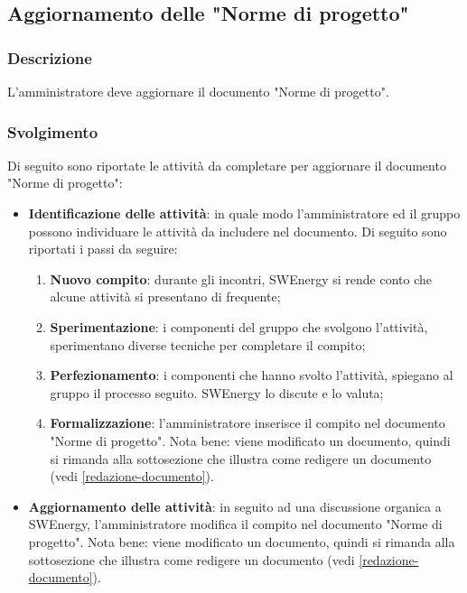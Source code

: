 \subsection{Aggiornamento delle "Norme di progetto"}
\label{aggiornare-ndp}

\subsubsection{Descrizione}

L'amministratore deve aggiornare il documento "Norme di progetto".

\subsubsection{Svolgimento}
Di seguito sono riportate le attività da completare per aggiornare il documento
"Norme di progetto":
\begin{itemize}
	\item \textbf{Identificazione delle attività}: in quale modo
	      l'amministratore ed il gruppo possono individuare le attività da
	      includere nel documento. Di seguito sono riportati i passi da
	      seguire:
	      \begin{enumerate}
		      \item \textbf{Nuovo compito}: durante gli incontri,
		            SWEnergy si rende conto che alcune attività si
		            presentano di frequente;

		      \item \textbf{Sperimentazione}: i componenti del gruppo che
		            svolgono l'attività, sperimentano diverse tecniche per
		            completare il compito;

		      \item \textbf{Perfezionamento}: i componenti che hanno
		            svolto l'attività, spiegano al gruppo il processo
		            seguito. SWEnergy lo discute e lo valuta;

		      \item \textbf{Formalizzazione}: l'amministratore inserisce il
		            compito nel documento "Norme di progetto". Nota bene:
		            viene modificato un documento, quindi si rimanda alla
		            sottosezione che illustra come redigere un documento
		            (vedi \autoref{redazione-documento}).
	      \end{enumerate}

	\item \textbf{Aggiornamento delle attività}: in seguito ad una discussione
	      organica a SWEnergy, l'amministratore modifica il
	      compito nel documento "Norme di progetto". Nota bene:
	      viene modificato un documento, quindi si rimanda alla
	      sottosezione che illustra come redigere un documento
	      (vedi \autoref{redazione-documento}).
\end{itemize}

